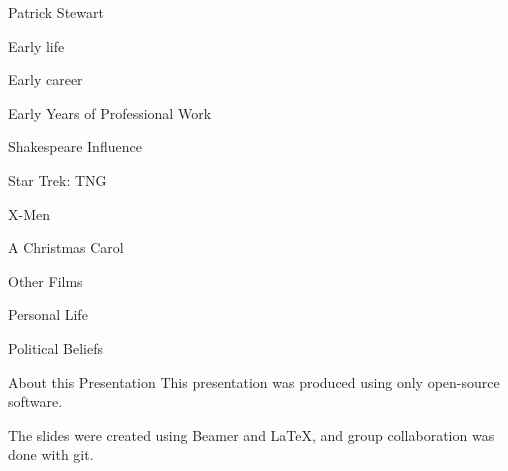 \documentclass{beamer}
\begin{document}
\begin{frame}{Patrick Stewart}

\end{frame}
\begin{frame}{Early life}

\end{frame}
\begin{frame}{Early career}

\end{frame}
\begin{frame}{Early Years of Professional Work}

\end{frame}
\begin{frame}{Shakespeare Influence}

\end{frame}
\begin{frame}{Star Trek: TNG}

\end{frame}
\begin{frame}{X-Men}

\end{frame}
\begin{frame}{A Christmas Carol}

\end{frame}
\begin{frame}{Other Films}

\end{frame}
\begin{frame}{Personal Life}

\end{frame}
\begin{frame}{Political Beliefs}

\end{frame}
\begin{frame}{About this Presentation}
This presentation was produced using only open-source software.

The slides were created using Beamer and LaTeX, and group collaboration was done
with git.

\end{frame}
\end{document}
